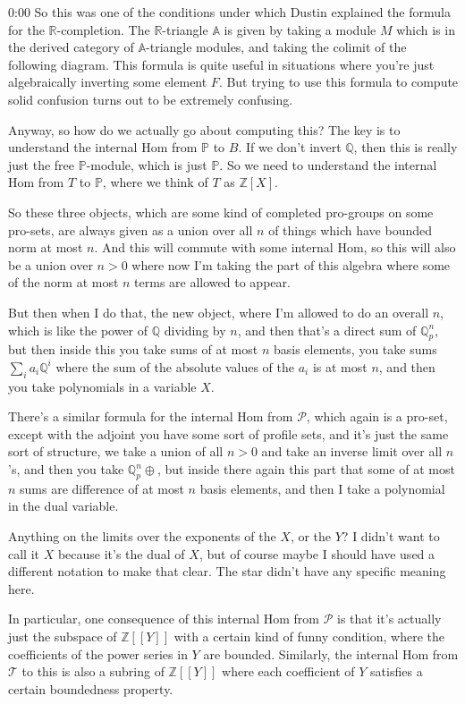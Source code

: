\begin{unfinished}{0:00}
So this was one of the conditions under which Dustin explained the formula for the $\mathbb{R}$-completion. The $\mathbb{R}$-triangle $\mathbb{A}$ is given by taking a module $M$ which is in the derived category of $\mathbb{A}$-triangle modules, and taking the colimit of the following diagram. This formula is quite useful in situations where you're just algebraically inverting some element $F$. But trying to use this formula to compute solid confusion turns out to be extremely confusing.

Anyway, so how do we actually go about computing this? The key is to understand the internal Hom from $\mathbb{P}$ to $B$. If we don't invert $\mathbb{Q}$, then this is really just the free $\mathbb{P}$-module, which is just $\mathbb{P}$. So we need to understand the internal Hom from $T$ to $\mathbb{P}$, where we think of $T$ as $\mathbb{Z}[X]$.

So these three objects, which are some kind of completed pro-groups on some pro-sets, are always given as a union over all $n$ of things which have bounded norm at most $n$. And this will commute with some internal Hom, so this will also be a union over $n > 0$ where now I'm taking the part of this algebra where some of the norm at most $n$ terms are allowed to appear. 

But then when I do that, the new object, where I'm allowed to do an overall $n$, which is like the power of $\mathbb{Q}$ dividing by $n$, and then that's a direct sum of $\mathbb{Q}_p^n$, but then inside this you take sums of at most $n$ basis elements, you take sums $\sum_{i} a_i \mathbb{Q}^i$ where the sum of the absolute values of the $a_i$ is at most $n$, and then you take polynomials in a variable $X$.

There's a similar formula for the internal Hom from $\mathcal{P}$, which again is a pro-set, except with the adjoint you have some sort of profile sets, and it's just the same sort of structure, we take a union of all $n > 0$ and take an inverse limit over all $n$'s, and then you take $\mathbb{Q}_p^n \oplus$, but inside there again this part that some of at most $n$ sums are difference of at most $n$ basis elements, and then I take a polynomial in the dual variable.

Anything on the limits over the exponents of the $X$, or the $Y$? I didn't want to call it $X$ because it's the dual of $X$, but of course maybe I should have used a different notation to make that clear. The star didn't have any specific meaning here.

In particular, one consequence of this internal Hom from $\mathcal{P}$ is that it's actually just the subspace of $\mathbb{Z}[[Y]]$ with a certain kind of funny condition, where the coefficients of the power series in $Y$ are bounded. Similarly, the internal Hom from $\mathcal{T}$ to this is also a subring of $\mathbb{Z}[[Y]]$ where each coefficient of $Y$ satisfies a certain boundedness property.


\end{unfinished}
